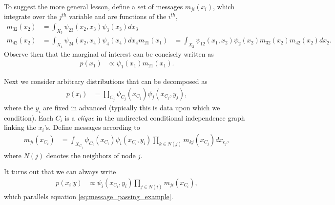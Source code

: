 \documentclass{article}
\begin{document}
To suggest the more general lesson, define a set of messages
$m_{ji}\left(x_i\right)$, which integrate over the $j^{th}$ variable and are
functions of the $i^{th}$,
\begin{align*}
  m_{32}\left(x_2\right) &= \int_{X_3} \psi_{23}\left(x_2, x_3\right)\psi_3\left(x_3\right) dx_3 \\
  m_{42}\left(x_2\right) &= \int_{X_4} \psi_{24}\left(x_2, x_4\right)\psi_4\left(x_4\right) dx_4
  m_{21}\left(x_1\right) &= \int_{X_2} \psi_{12}\left(x_1, x_2\right) \psi_2\left(x_2\right) m_{32}\left(x_2\right) m_{42}\left(x_2\right) dx_2.
\end{align*}
Observe then that the marginal of interest can be concisely written as
\begin{align}
  \label{eq:message_passing_example}
  p\left(x_1\right) &\propto \psi_1\left(x_1\right) m_{21}\left(x_1\right).
\end{align}

Next we consider arbitrary distributions that can be decomposed as
\begin{align*}
  p\left(x_i\right) &= \prod_{C_j} \psi_{C_j}\left(x_{C_j}\right)\psi_{j}\left(x_{C_j}, y_{j}\right),
\end{align*}
where the $y_i$ are fixed in advanced (typically this is data upon which we
condition). Each $C_i$ is a \textit{clique} in the undirected conditional
independence graph linking the $x_i$'s. Define messages according to
\begin{align*}
  m_{ji}\left(x_{C_i}\right) &= \int_{X_{C_{j}}} \psi_{C_i}\left(x_{C_{i}}\right) \psi_{i}\left(x_{C_{i}}, y_{i}\right) \prod_{k \in N\left(j\right)} m_{kj}\left(x_{C_{j}}\right) dx_{c_{j}},
\end{align*}
where $N\left(j\right)$ denotes the neighbors of node $j$.

It turns out that we can always write
\begin{align}
  \label{eq:message_update}
  p\left(x_{i} \vert y\right) &\propto \psi_{i}\left(x_{C_i}, y_i\right) \prod_{j \in N\left(i\right)} m_{ji}\left(x_{C_i}\right),
\end{align}
which parallels equation \ref{eq:message_passing_example}.
\end{document}
